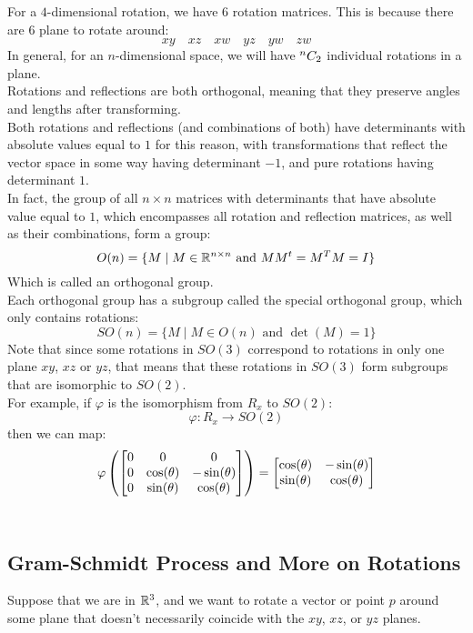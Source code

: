 \documentclass[12pt]{article}
\begin{document}
For a $4$-dimensional rotation, we have $6$
rotation matrices. 
This is because there are $6$ plane to rotate
around:
\[ xy \quad xz \quad xw \quad
yz \quad yw \quad zw \] 
In general, for an $n$-dimensional space,
we will have ${}^{n}C_{2}$ individual
rotations in a plane. \\

Rotations and reflections are both
orthogonal, meaning that they preserve
angles and lengths after transforming. \\
Both rotations and reflections
(and combinations of both)
have determinants with absolute values
equal to $1$ for this reason,
with transformations that reflect
the vector space in some way having
determinant $-1$,
and pure rotations having determinant $1$. \\

In fact, the group of all $n \times n$
matrices with determinants
that have absolute value equal to $1$,
which encompasses all rotation and reflection
matrices, as well as their combinations,
form a group:
\[ O(n) = \{ M \mid M \in \mathbb{R}^{n \times n}
\text{ and } MM^t = M^TM = I \} \]
Which is called an orthogonal group. \\

Each orthogonal group has a
subgroup called the special
orthogonal group, which only contains
rotations:
\[ SO(n) = \{ M \mid M \in O(n)
\text{ and } \det(M) = 1 \} \]
Note that since some
rotations in $SO(3)$
correspond to rotations in only
one plane $xy$, $xz$ or $yz$,
that means that these rotations
in $SO(3)$ form subgroups that are
isomorphic to $SO(2)$. \\

For example, if $\varphi$
is the isomorphism from $R_x$
to $SO(2)$:
\[ \varphi: R_x \to SO(2) \]
then we can map:
\[ \varphi\left( 
\begin{bmatrix} {0} & {0} & {0} \\ {0} & {\cos(\theta)} &
{-\sin(\theta)} \\ {0} & {\sin(\theta)} &
{\cos(\theta)} \end{bmatrix} \right)
= \begin{bmatrix} {\cos(\theta)} &
{-\sin(\theta)} \\ {\sin(\theta)} &
{\cos(\theta)} \end{bmatrix} \] \\

\newpage

\subsection*{Gram-Schmidt Process and
More on Rotations}

Suppose that we are in $\mathbb{R}^3$,
and we want to rotate
a vector or point $p$ around some plane
that doesn't necessarily coincide
with the $xy$, $xz$, or $yz$ planes. \\
\end{document}
